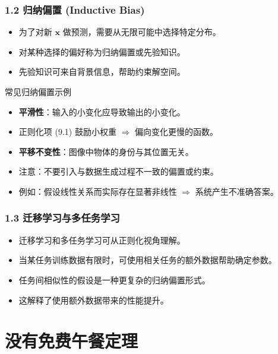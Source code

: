 \documentclass[t,aspectratio=169]{beamer} %
\begin{document}
\begin{frame}
    \frametitle{1.2 归纳偏置 (Inductive Bias)}
    \begin{itemize}
        \item 为了对新 $\mathbf{x}$ 做预测，需要从无限可能中\alert{选择特定分布}。
        \item 对某种选择的偏好称为\alert{归纳偏置}或\alert{先验知识}。
        \item 先验知识可来自背景信息，帮助约束解空间。
    \end{itemize}
    \begin{block}{常见归纳偏置示例}
        \begin{itemize}
            \item \textbf{平滑性}：输入的小变化应导致输出的小变化。
            \item 正则化项 (9.1) 鼓励小权重 $\Rightarrow$ 偏向变化更慢的函数。
            \item \textbf{平移不变性}：图像中物体的身份与其位置无关。
        \end{itemize}
    \end{block}
    \begin{itemize}
        \item \alert{注意}：不要引入与数据生成过程不一致的偏置或约束。
        \item 例如：假设线性关系而实际存在显著非线性 $\Rightarrow$ 系统产生不准确答案。
    \end{itemize}
\end{frame}

\begin{frame}
    \frametitle{1.3 迁移学习与多任务学习}
    \begin{itemize}
        \item 迁移学习和多任务学习可从\alert{正则化}视角理解。
        \item 当某任务训练数据有限时，可使用\alert{相关任务}的额外数据帮助确定参数。
        \item 任务间相似性的假设是一种\alert{更复杂的归纳偏置}形式。
        \item 这解释了使用额外数据带来的性能提升。
    \end{itemize}
\end{frame}

\section{没有免费午餐定理}
\end{document}

